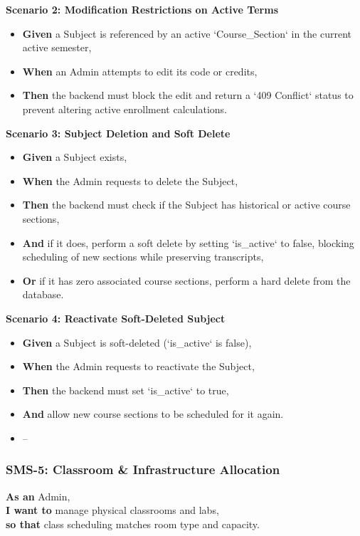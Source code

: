 \noindent\textbf{Scenario 2: Modification Restrictions on Active Terms}\\
\begin{itemize}
  \item \textbf{Given} a Subject is referenced by an active `Course\_Section` in the current active semester,
  \item \textbf{When} an Admin attempts to edit its code or credits,
  \item \textbf{Then} the backend must block the edit and return a `409 Conflict` status to prevent altering active enrollment calculations.
\end{itemize}


\noindent\textbf{Scenario 3: Subject Deletion and Soft Delete}\\
\begin{itemize}
  \item \textbf{Given} a Subject exists,
  \item \textbf{When} the Admin requests to delete the Subject,
  \item \textbf{Then} the backend must check if the Subject has historical or active course sections,
  \item \textbf{And} if it does, perform a soft delete by setting `is\_active` to false, blocking scheduling of new sections while preserving transcripts,
  \item \textbf{Or} if it has zero associated course sections, perform a hard delete from the database.
\end{itemize}


\noindent\textbf{Scenario 4: Reactivate Soft-Deleted Subject}\\
\begin{itemize}
  \item \textbf{Given} a Subject is soft-deleted (`is\_active` is false),
  \item \textbf{When} the Admin requests to reactivate the Subject,
  \item \textbf{Then} the backend must set `is\_active` to true,
  \item \textbf{And} allow new course sections to be scheduled for it again.
\end{itemize}

\begin{itemize}
  \item --
\end{itemize}

\subsubsection{SMS-5: Classroom \& Infrastructure Allocation}
\noindent \textbf{As an} Admin, \\
\noindent \textbf{I want to} manage physical classrooms and labs, \\
\noindent \textbf{so that} class scheduling matches room type and capacity. \\



